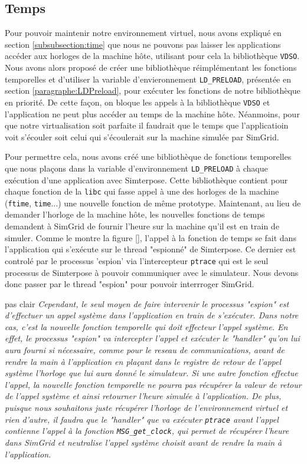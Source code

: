 \subsection{Temps}
\label{section:work:time}

Pour pouvoir maintenir notre environnement virtuel, nous avons expliqué en section \ref{subsubsection:time} que nous ne pouvons pas laisser les applications accéder aux horloges de la machine hôte, utilisant pour cela la bibliothèque \texttt{VDSO}. Nous avons alors proposé de créer une bibliothèque réimplémentant les fonctions temporelles et d'utiliser la variable d'envieronnement \texttt{LD\_PRELOAD}, présentée en section \ref{paragraphe:LDPreload}, pour exécuter les fonctions de notre bibliothèque en priorité. De cette façon, on bloque les appels à la bibliothèque \texttt{VDSO} et l'application ne peut plus accéder au temps de la machine hôte. Néanmoins, pour que notre virtualisation soit parfaite il faudrait que le temps que l'applicatioin voit s'écouler soit celui qui s'écoulerait sur la machine simulée par SimGrid. 

Pour permettre cela, nous avons créé une bibliothèque de fonctions temporelles que nous plaçons dans la variable d'environnement \texttt{LD\_PRELOAD} à chaque exécution d'une application avec Simterpose. Cette bibliothèque contient pour chaque fonction de la \texttt{libc} qui fasse appel à une des horloges de la machine (\texttt{ftime}, \texttt{time}...) une nouvelle fonction de même prototype. Maintenant, au lieu de demander l'horloge de la machine hôte, les nouvelles fonctions de temps demandent à SimGrid de fournir l'heure sur la machine qu'il est en train de simuler. Comme le montre la figure \ref{}, l'appel à la fonction de temps se fait dans l'application qui s'exécute sur le thread "espionné" de Simterpose. Ce dernier est controlé par le processus 'espion' via l'intercepteur \texttt{ptrace} qui est le seul processus de Simterpose à pouvoir communiquer avec le simulateur. Nous devons donc passer par le thread "espion" pour pouvoir interrroger SimGrid. 

{\color{red} pas clair}
\textit{Cependant, le seul moyen de faire intervenir le processus "espion" est d'effectuer un appel système dans l'application en train de s'exécuter. Dans notre cas, c'est la nouvelle fonction temporelle qui doit effecteur l'appel système. En effet, le processus "espion" va intercepter l'appel et exécuter le "handler" qu'on lui aura fourni si nécessaire, comme pour le reseau de communications, avant de rendre la main à l'application en plaçant dans le registre de retour de l'appel système l'horloge que lui aura donné le simulateur. Si une autre fonction effectue l'appel, la nouvelle fonction temporelle ne pourra pas récupérer la valeur de retour de l'appel système et ainsi retourner l'heure simulée à l'application. De plus, puisque nous souhaitons juste récupérer l'horloge de l'environnement virtuel et rien d'autre, il faudra que le "handler" que va exécuter \texttt{ptrace} avant l'appel contienne l'appel à la fonction \texttt{MSG\_get\_clock}, qui permet de récupérer l'heure dans SimGrid et neutralise l'appel système choisit avant de rendre la main à l'application. 
}

